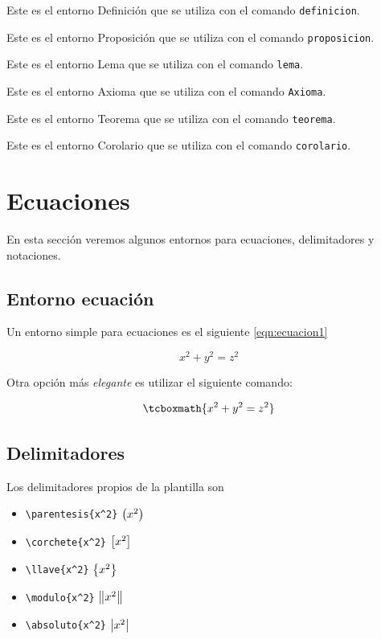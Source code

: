 \begin{definicion}
    Este es el entorno Definición que se utiliza con el comando \verb|definicion|.
\end{definicion}

\begin{proposicion}
    Este es el entorno Proposición que se utiliza con el comando \verb|proposicion|.
\end{proposicion}

\begin{lema}
    Este es el entorno Lema que se utiliza con el comando \verb|lema|.
\end{lema}

\begin{axioma}
    Este es el entorno Axioma que se utiliza con el comando \verb|Axioma|.
\end{axioma}

\begin{teorema}
    Este es el entorno Teorema que se utiliza con el comando \verb|teorema|.
\end{teorema}

\begin{corolario}
    Este es el entorno Corolario que se utiliza con el comando \verb|corolario|.
\end{corolario}


\section{Ecuaciones}
En esta sección veremos algunos entornos para ecuaciones, delimitadores y notaciones.

\subsection{Entorno ecuación}
Un entorno simple para ecuaciones es el siguiente \ref{eqn:ecuacion1}

\begin{equation}
    x^2 + y^2 = z^2 
    \label{eqn:ecuacion1}
\end{equation}

Otra opción más \textit{elegante} es utilizar el siguiente comando:

\begin{equation}
    \tcboxmath{ 
    x^2 + y^2 = z^2
    }
    \label{eqn:ecuacion2}
\end{equation}

\subsection{Delimitadores}
Los delimitadores propios de la plantilla son
\begin{itemize}
    \item \verb|\parentesis{x^2}|  $\left ( {x^2} \right )$
    \item \verb|\corchete{x^2}|  $\left [ {x^2} \right ]$
    \item \verb|\llave{x^2}|  $\left \{ {x^2} \right \}$
    \item \verb|\modulo{x^2}|  $\left \| {x^2} \right \|$
    \item \verb|\absoluto{x^2}|  $\left | {x^2} \right |$
\end{itemize}

